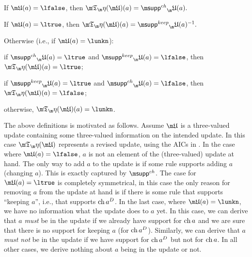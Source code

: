 \begin{definition}
\begin{compactitem}
 \item If $\UUU(a)=\lfalse$, then $\Ap(\UUU)(a) = \suppin_\UUU(a).$
 \item If $\UUU(a)=\ltrue$, then $\Ap(\UUU)(a) = \suppout_\UUU(a)^{-1}.$
 \item Otherwise (i.e., if $\UUU(a) = \lunkn$):
  \begin{compactitem}
    \item if $\suppin_\UUU(a) = \ltrue$ and $\suppout_\UUU(a)=\lfalse$, then $\Ap(\UUU)(a)=\ltrue$;
    \item if $\suppout_\UUU(a) = \ltrue$ and $\suppin_\UUU(a)=\lfalse$, then $\Ap(\UUU)(a)=\lfalse$;
    \item otherwise, $\Ap(\UUU)(a)=\lunkn$.
\end{compactitem}

\end{compactitem}

 
\end{definition}

The above definitions is motivated as follows. Assume $\UUU$ is a three-valued update containing some three-valued information on the intended update. In this case $\Ap(\UUU)$ represents a revised update, using the AICs in \aics. 
In the case where $\UUU(a)=\lfalse$, $a$ is not an element of the (three-valued) update at hand. The only way to add $a$ to the update is if some rule supports adding $a$ (changing $a$). This is exactly captured by $\suppin$. 
The case for $\UUU(a)=\ltrue$ is completely symmetrical, in this case the only reason for removing $a$ from the update at hand is if there is some rule that supports ``keeping $a$'', i.e., that supports $\operatorname{ch} a^D$. 
In the last case, where $\UUU(a)=\lunkn$, we have no information what the update does to $a$ yet. In this case, we can derive that $a$ \emph{must} be in the update if we already have support for $\operatorname{ch} a$ and we are sure that there is no support for keeping $a$ (for $\operatorname{ch} a^D$). Similarly, we can derive that $a$ \emph{must not} be in the update if we have support for $\operatorname{ch} a^D$ but not for $\operatorname{ch} a$. 
In all other cases, we derive nothing about $a$ being in the update or not. 



